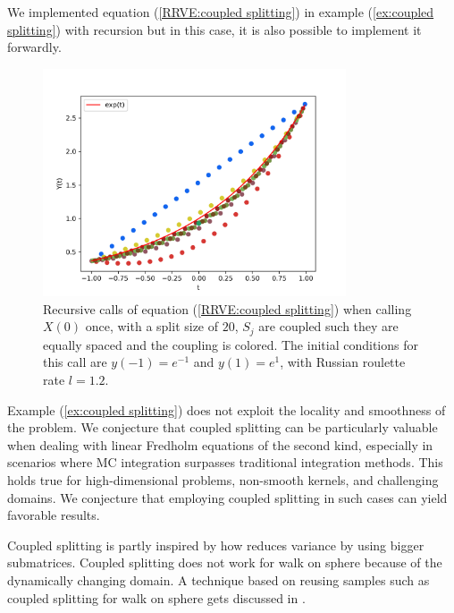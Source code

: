 \documentclass[a4paper,12pt]{article}
\begin{document}
\begin{pythonn} \label{py:coupled splitting}
    We implemented equation (\ref{RRVE:coupled splitting}) in example
    (\ref{ex:coupled splitting}) with recursion but in this case, it
    is also possible to implement it forwardly. \\

    \begin{figure}[h!]
        \centering
        \includegraphics[width=0.8\textwidth]{plots/coupled split.png}
        \caption{Recursive calls of equation (\ref{RRVE:coupled splitting}) when
        calling $X(0)$ once,
        with a split size of $20$, $S_{j}$ are coupled such
        they are equally spaced and the coupling is colored.
        The initial conditions for this call are $y(-1)=e^{-1}$ and $y(1)=e^{1}$,
        with Russian roulette rate $l=1.2$.  }
        \label{fig:coupled splitting}
    \end{figure}
\end{pythonn}


Example (\ref{ex:coupled splitting}) does not
exploit the locality and smoothness of the problem.
We conjecture that coupled splitting can be particularly valuable when
dealing with linear Fredholm equations of the second kind,
especially in scenarios where MC integration surpasses
traditional integration methods. This holds true for
high-dimensional problems, non-smooth kernels, and
challenging domains. We conjecture that employing
coupled splitting in such cases can yield favorable results.

\begin{related}
    Coupled splitting is partly inspired by how \cite{sabelfeld_sparsified_2009}
    reduces variance by using bigger submatrices.
    Coupled splitting does not work for walk on sphere because
    of the dynamically changing domain. A technique based on reusing samples
    such as coupled splitting for walk on sphere gets discussed
    in \cite{miller_boundary_2023}.
\end{related}
\end{document}
